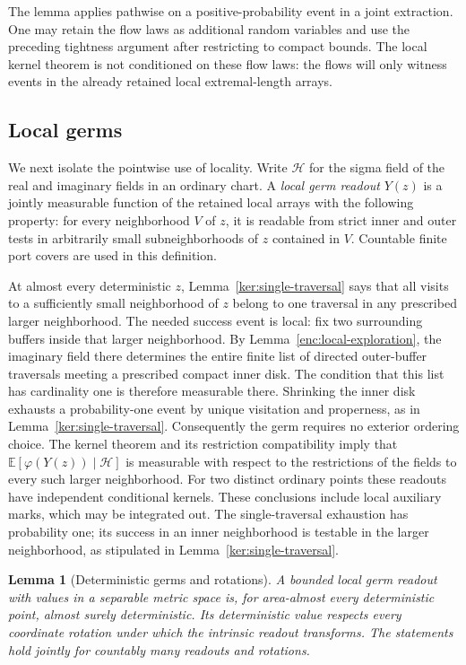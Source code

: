 \documentclass[11pt]{article}
\numberwithin{equation}{section}
\newtheorem{lemma}[theorem]{Lemma}
\theoremstyle{definition}
\theoremstyle{remark}
\newcommand{\1}{\mathbf 1}
\begin{document}
The lemma applies pathwise on a positive-probability event in a joint
extraction.  One may retain the flow laws as additional random
variables and use the preceding tightness argument after restricting
to compact bounds.  The local kernel theorem is not conditioned on
these flow laws: the flows will only witness events in the already
retained local extremal-length arrays.

\subsection{Local germs}
\label{conf:germ-subsection}

We next isolate the pointwise use of locality.  Write
\(\mathcal H\) for the sigma field of the real and imaginary fields
in an ordinary chart.  A \emph{local germ readout} \(Y(z)\) is a
jointly measurable function of the retained local arrays with the
following property: for every neighborhood \(V\) of \(z\), it is
readable from strict inner and outer tests in arbitrarily small
subneighborhoods of \(z\) contained in \(V\).  Countable finite
port covers are used in this definition.

At almost every deterministic \(z\), Lemma~\ref{ker:single-traversal}
says that all visits to a sufficiently small neighborhood of \(z\)
belong to one traversal in any prescribed larger neighborhood.
The needed success event is local: fix two surrounding buffers inside
that larger neighborhood. By Lemma~\ref{enc:local-exploration}, the
imaginary field there determines the entire finite list of directed
outer-buffer traversals meeting a prescribed compact inner disk. The
condition that this list has cardinality one is therefore measurable
there. Shrinking the inner disk exhausts a probability-one event by
unique visitation and properness, as in Lemma~\ref{ker:single-traversal}.
Consequently the germ requires no exterior ordering choice. The
kernel theorem and its restriction compatibility imply that
\(\mathbb E[\varphi(Y(z))\mid\mathcal H]\) is measurable with respect
to the restrictions of the fields to every such larger neighborhood.
For two distinct ordinary points these readouts have independent
conditional kernels.  These conclusions include local auxiliary marks,
which may be integrated out.  The single-traversal exhaustion has
probability one; its success in an inner neighborhood is testable in
the larger neighborhood, as stipulated in
Lemma~\ref{ker:single-traversal}.

\begin{lemma}[Deterministic germs and rotations]
\label{conf:germs}
A bounded local germ readout with values in a separable metric space
is, for area-almost every deterministic point, almost surely
deterministic.  Its deterministic value respects every coordinate
rotation under which the intrinsic readout transforms.  The statements
hold jointly for countably many readouts and rotations.
\end{lemma}
\end{document}
